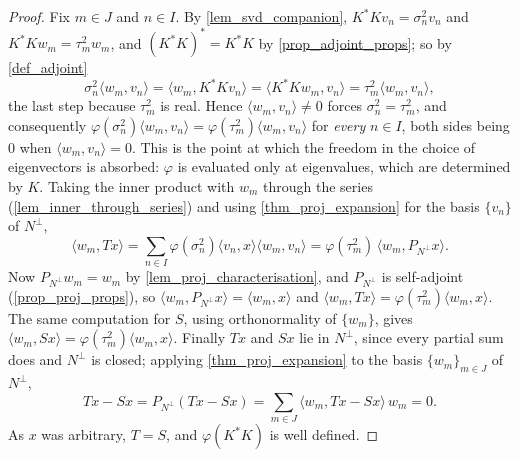 \documentclass[a4paper]{report}
\theoremstyle{plain}
\theoremstyle{definition}
\theoremstyle{remark}
\begin{document}
\begin{proof}
  Fix $m \in J$ and $n \in I$.  By \cref{lem_svd_companion}, $K^*Kv_n = \sigma_n^2v_n$ and
  $K^*Kw_m = \tau_m^2w_m$, and $(K^*K)^* = K^*K$ by \cref{prop_adjoint_props}; so by
  \cref{def_adjoint}
  \[
    \sigma_n^2\langle w_m,v_n\rangle
      = \langle w_m, K^*Kv_n\rangle
      = \langle K^*Kw_m, v_n\rangle
      = \tau_m^2\langle w_m,v_n\rangle ,
  \]
  the last step because $\tau_m^2$ is real.  Hence $\langle w_m,v_n\rangle \ne 0$ forces
  $\sigma_n^2 = \tau_m^2$, and consequently
  $\varphi(\sigma_n^2)\langle w_m,v_n\rangle = \varphi(\tau_m^2)\langle w_m,v_n\rangle$
  for \emph{every} $n \in I$, both sides being $0$ when $\langle w_m,v_n\rangle = 0$.
  This is the point at which the freedom in the choice of eigenvectors is absorbed:
  $\varphi$ is evaluated only at eigenvalues, which are determined by $K$.  Taking the
  inner product with $w_m$ through the series (\cref{lem_inner_through_series}) and using
  \cref{thm_proj_expansion} for the basis $\{v_n\}$ of $N^\perp$,
  \[
    \langle w_m, Tx\rangle
      = \sum_{n \in I}\varphi(\sigma_n^2)\langle v_n,x\rangle\langle w_m,v_n\rangle
      = \varphi(\tau_m^2)\,\langle w_m, P_{N^\perp}x\rangle .
  \]
  Now $P_{N^\perp}w_m = w_m$ by \cref{lem_proj_characterisation}, and $P_{N^\perp}$ is
  self-adjoint (\cref{prop_proj_props}), so
  $\langle w_m, P_{N^\perp}x\rangle = \langle w_m,x\rangle$ and
  $\langle w_m, Tx\rangle = \varphi(\tau_m^2)\langle w_m,x\rangle$.  The same computation
  for $S$, using orthonormality of $\{w_m\}$, gives
  $\langle w_m, Sx\rangle = \varphi(\tau_m^2)\langle w_m,x\rangle$.  Finally $Tx$ and $Sx$
  lie in $N^\perp$, since every partial sum does and $N^\perp$ is closed; applying
  \cref{thm_proj_expansion} to the basis $\{w_m\}_{m \in J}$ of $N^\perp$,
  \[
    Tx - Sx = P_{N^\perp}(Tx-Sx)
      = \sum_{m \in J}\langle w_m, Tx-Sx\rangle\,w_m = 0 .
  \]
  As $x$ was arbitrary, $T = S$, and $\varphi(K^*K)$ is well defined.
\end{proof}
\end{document}
